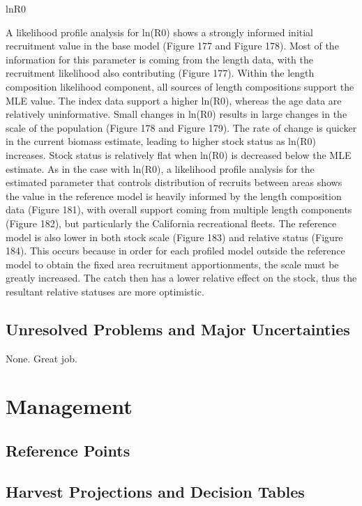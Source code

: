\documentclass[
]{scrartcl}
\begin{document}
lnR0

A likelihood profile analysis for ln(R0) shows a strongly informed
initial recruitment value in the base model (Figure 177 and Figure 178).
Most of the information for this parameter is coming from the length
data, with the recruitment likelihood also contributing (Figure 177).
Within the length composition likelihood component, all sources of
length compositions support the MLE value. The index data support a
higher ln(R0), whereas the age data are relatively uninformative. Small
changes in ln(R0) results in large changes in the scale of the
population (Figure 178 and Figure 179). The rate of change is quicker in
the current biomass estimate, leading to higher stock status as ln(R0)
increases. Stock status is relatively flat when ln(R0) is decreased
below the MLE estimate. As in the case with ln(R0), a likelihood profile
analysis for the estimated parameter that controls distribution of
recruits between areas shows the value in the reference model is heavily
informed by the length composition data (Figure 181), with overall
support coming from multiple length components (Figure 182), but
particularly the California recreational fleets. The reference model is
also lower in both stock scale (Figure 183) and relative status (Figure
184). This occurs because in order for each profiled model outside the
reference model to obtain the fixed area recruitment apportionments, the
scale must be greatly increased. The catch then has a lower relative
effect on the stock, thus the resultant relative statuses are more
optimistic.

\subsection{Unresolved Problems and Major
Uncertainties}\label{unresolved-problems-and-major-uncertainties}

None. Great job.

\newpage{}

\section{Management}\label{management}

\subsection{Reference Points}\label{reference-points}

\subsection{Harvest Projections and Decision
Tables}\label{harvest-projections-and-decision-tables}
\end{document}
